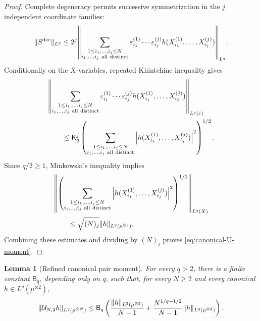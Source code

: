 \documentclass[11pt,reqno]{amsart}
\numberwithin{equation}{section}
\theoremstyle{plain}
\newtheorem{lemma}[lemma]{Lemma}
\theoremstyle{remark}
\DeclarePairedDelimiter{\pa}{\lparen}{\rparen}
\DeclarePairedDelimiter{\norm}{\lVert}{\rVert}
\begin{document}
\begin{proof}
Complete degeneracy permits successive symmetrization in the \(j\) independent coordinate families:
\begin{align}\label{eq:canonical-U-successive-symmetrization}
 \norm{S^{\mathrm{dec}}}_{L^q}
 \le 2^j
 \norm*{
 \sum_{\substack{1\le i_1,\ldots,i_j\le N\\
 i_1,\ldots,i_j\ \mathrm{all\ distinct}}}
 \varepsilon_{i_1}^{(1)}\cdots\varepsilon_{i_j}^{(j)}
 h\pa{X_{i_1}^{(1)},\ldots,X_{i_j}^{(j)}}}_{L^q}.
\end{align}
Conditionally on the \(X\)-variables, repeated Khintchine inequality gives
\begin{align}\label{eq:canonical-U-rademacher-bound}
 &\norm*{
 \sum_{\substack{1\le i_1,\ldots,i_j\le N\\
 i_1,\ldots,i_j\ \mathrm{all\ distinct}}}
 \varepsilon_{i_1}^{(1)}\cdots\varepsilon_{i_j}^{(j)}
 h\pa{X_{i_1}^{(1)},\ldots,X_{i_j}^{(j)}}}_{L^q(\varepsilon)}\notag\\
 &\qquad\le \mathsf K_q^j
 \left(
 \sum_{\substack{1\le i_1,\ldots,i_j\le N\\
 i_1,\ldots,i_j\ \mathrm{all\ distinct}}}
 \left|h\pa{X_{i_1}^{(1)},\ldots,X_{i_j}^{(j)}}\right|^2
 \right)^{1/2}.
\end{align}
Since \(q/2\ge1\), Minkowski's inequality implies
\begin{align}\label{eq:canonical-U-square-function}
 &\norm*{
 \left(
 \sum_{\substack{1\le i_1,\ldots,i_j\le N\\
 i_1,\ldots,i_j\ \mathrm{all\ distinct}}}
 \left|h\pa{X_{i_1}^{(1)},\ldots,X_{i_j}^{(j)}}\right|^2
 \right)^{1/2}}_{L^q(X)}\notag\\
 &\qquad\le \sqrt{(N)_j}\norm{h}_{L^q(\mu^{\otimes j})}.
\end{align}
Combining these estimates and dividing by \((N)_j\) proves \eqref{eq:canonical-U-moment}.
\end{proof}

\begin{lemma}[Refined canonical pair moment]
\label{lem:refined-canonical-pair-moment}
For every \(q>2\), there is a finite constant \(\mathsf B_q\), depending only on \(q\), such that, for every \(N\ge2\) and every canonical \(h\in L^q(\mu^{\otimes2})\),
\begin{align}\label{eq:refined-canonical-pair-moment}
 \norm{\mathcal U_{N,2}h}_{L^q(\mu^{\otimes N})}
 \le \mathsf B_q
 \left(
 \frac{\norm{h}_{L^2(\mu^{\otimes2})}}{N-1}
 +\frac{N^{1/q-1/2}}{N-1}
 \norm{h}_{L^q(\mu^{\otimes2})}
 \right).
\end{align}
\end{lemma}
\end{document}
